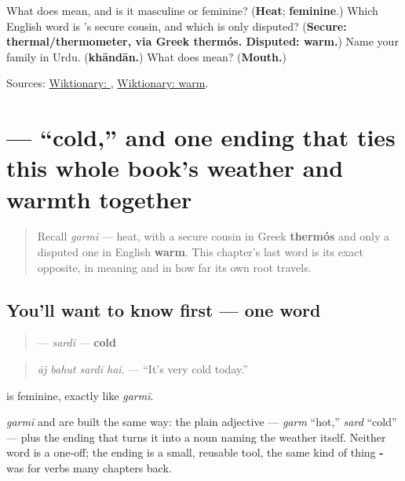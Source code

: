 \begin{tcolorbox}[breakable,colback=teal!4,colframe=teal!35!black,title={Before you move on}]
What does \textbf{} mean, and is it masculine or feminine? (\textbf{Heat}; \textbf{feminine}.) Which English word is \textbf{}'s secure cousin, and which is only disputed? (\textbf{Secure: thermal/thermometer, via Greek thermós. Disputed: warm.}) Name your family in Urdu. (\textbf{khāndān.}) What does \textbf{} mean? (\textbf{Mouth.})

Sources: \href{https://en.wiktionary.org/wiki/\%DA\%AF\%D8\%B1\%D9\%85\%DB\%8C}{Wiktionary: }, \href{https://en.wiktionary.org/wiki/warm}{Wiktionary: warm}.
\end{tcolorbox}
\section[\texorpdfstring{\ur{سردی} (sardī)}{سردی (sardī)}]{ — \textquotedblleft{}cold,\textquotedblright{} and one ending that ties this whole book's weather and warmth together}

\label{lesson:UR-C15-sardi}



\begin{quote}
Recall \emph{garmī} — heat, with a secure cousin in Greek \textbf{thermós} and only a disputed one in English \textbf{warm}. This chapter's last word is its exact opposite, in meaning and in how far its own root travels.
\end{quote}

\subsection*{You'll want to know first — one word}
\begin{quote}
\textbf{} — \emph{sardī} — \textbf{cold}
\end{quote}

\begin{quote}
\emph{āj bahut sardī hai.} — \textquotedblleft{}It's very cold today.\textquotedblright{}
\end{quote}

\textbf{} is feminine, exactly like \emph{garmī}.

\begin{grammarlens}[title={Grammar Lens: one ending, two weather words}]
\emph{garmī} and \textbf{} are built the same way: the plain adjective — \emph{garm} \textquotedblleft{}hot,\textquotedblright{} \textbf{} \emph{sard} \textquotedblleft{}cold\textquotedblright{} — plus the ending \textbf{} that turns it into a noun naming the weather itself. Neither word is a one-off; the ending is a small, reusable tool, the same kind of thing \textbf{-} was for verbs many chapters back.
\end{grammarlens}

